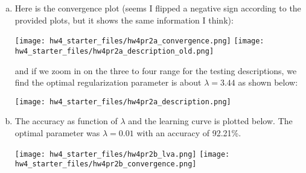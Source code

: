 \documentclass[12pt,letterpaper,fleqn]{hmcpset}
\begin{document}
\begin{solution}
\begin{enumerate}[(a)]
    \item Here is the convergence plot (seems I flipped a negative sign according to the provided plots, but it shows the same information I think):
    \begin{center}
        \texttt{[image: hw4\_starter\_files/hw4pr2a\_convergence.png]}
        \texttt{[image: hw4\_starter\_files/hw4pr2a\_description\_old.png]}
    \end{center}
    and if we zoom in on the three to four range for the testing descriptions, we find the optimal regularization parameter is about $\lambda = 3.44$ as shown below:
    \begin{center}
        \texttt{[image: hw4\_starter\_files/hw4pr2a\_description.png]}
    \end{center}


    \item The accuracy as function of $\lambda$ and the learning curve is plotted below. The optimal parameter was $\lambda = 0.01$ with an accuracy of 92.21\%. 
    \begin{center}
        \texttt{[image: hw4\_starter\_files/hw4pr2b\_lva.png]}
        \texttt{[image: hw4\_starter\_files/hw4pr2b\_convergence.png]}
    \end{center}

\end{enumerate}
\end{solution}
\newpage
\end{document}
